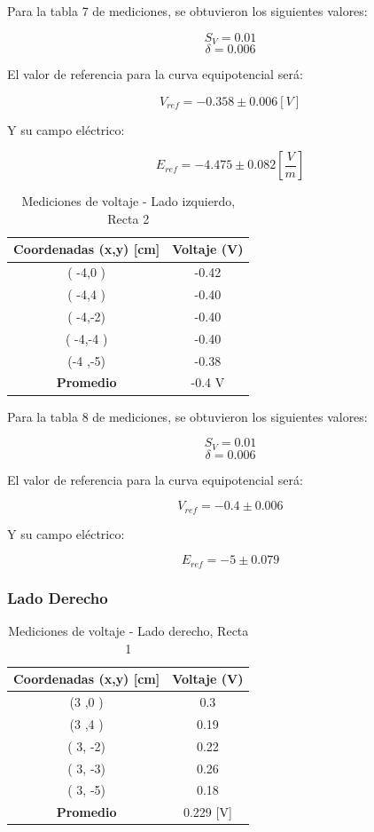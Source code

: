 \documentclass[11pt,twocolumn]{article}
\begin{document}
Para la tabla 7 de mediciones, se obtuvieron los siguientes valores:

\[S_V = 0.01\]
\[\delta = 0.006\]

El valor de referencia para la curva equipotencial será:

\[V_{ref} = -0.358 \pm 0.006 [V]\]

Y su campo eléctrico:

\[E_{ref} = -4.475 \pm 0.082 [\frac{V}{m}]\]

\begin{table}[h]
\centering
\caption{Mediciones de voltaje - Lado izquierdo, Recta 2}
\begin{tabular}{cc}
\toprule
\textbf{Coordenadas (x,y) [cm]} & \textbf{Voltaje (V)} \\
\midrule
( -4,0 ) & -0.42 \\
( -4,4 ) & -0.40 \\
( -4,-2) & -0.40 \\
( -4,-4 ) & -0.40 \\
(-4 ,-5) &  -0.38\\
\midrule
\textbf{Promedio} &  -0.4 V\\
\bottomrule
\end{tabular}
\end{table}

Para la tabla 8 de mediciones, se obtuvieron los siguientes valores:

\[S_V = 0.01\]
\[\delta = 0.006\]

El valor de referencia para la curva equipotencial será:

\[V_{ref} = -0.4 \pm 0.006\]

Y su campo eléctrico:

\[E_{ref} = -5 \pm 0.079\]

\subsubsection*{Lado Derecho}

\begin{table}[h]
\centering
\caption{Mediciones de voltaje - Lado derecho, Recta 1}
\begin{tabular}{cc}
\toprule
\textbf{Coordenadas (x,y) [cm]} & \textbf{Voltaje (V)} \\
\midrule
(3 ,0 ) &  0.3\\
(3 ,4 ) &  0.19\\
( 3, -2) &  0.22\\
( 3, -3) &  0.26\\
( 3, -5) & 0.18 \\
\midrule
\textbf{Promedio} &  0.229 [V]\\
\bottomrule
\end{tabular}
\end{table}
\end{document}
